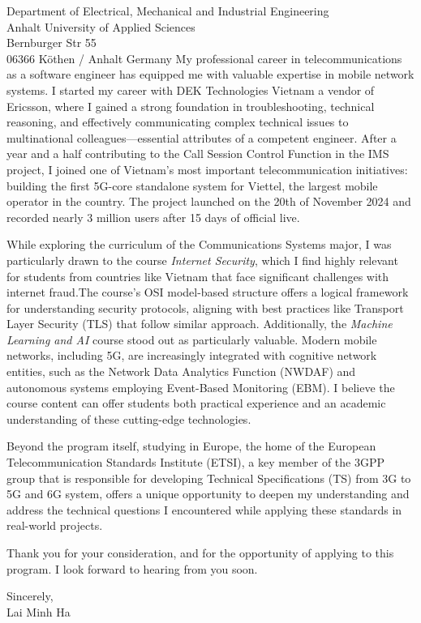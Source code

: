\documentclass[a4paper,12pt]{letter}
\begin{document}
\begin{letter}{
    Department of Electrical, Mechanical and Industrial Engineering
    \\ Anhalt University of Applied Sciences
    \\ Bernburger Str 55 
    \\ 06366 Köthen / Anhalt Germany
}
My professional career in telecommunications as a software engineer has equipped me with valuable expertise in mobile network systems. I started my career with DEK Technologies Vietnam a vendor of Ericsson, where I gained a strong foundation in troubleshooting, technical reasoning, and effectively communicating complex technical issues to multinational colleagues—essential attributes of a competent engineer. After a year and a half contributing to the Call Session Control Function in the IMS project, I joined one of Vietnam's most important telecommunication initiatives: building the first 5G-core standalone system for Viettel, the largest mobile operator in the country. The project launched on the 20th of November 2024 and recorded nearly 3 million users after 15 days of official live.

\vspace{1cm}
While exploring the curriculum of the Communications Systems major, I was particularly drawn to the course \textit{Internet Security}, which I find highly relevant for students from countries like Vietnam that face significant challenges with internet fraud.The course’s OSI model-based structure offers a logical framework for understanding security protocols, aligning with best practices like Transport Layer Security (TLS) that follow similar approach. Additionally, the \textit{Machine Learning and AI} course stood out as particularly valuable. Modern mobile networks, including 5G, are increasingly integrated with cognitive network entities, such as the Network Data Analytics Function (NWDAF) and autonomous systems employing Event-Based Monitoring (EBM). I believe the course content can offer students both practical experience and an academic understanding of these cutting-edge technologies.

Beyond the program itself, studying in Europe, the home of the European Telecommunication Standards Institute (ETSI), a key member of the 3GPP group that is responsible for developing Technical Specifications (TS) from 3G to 5G and 6G system, offers a unique opportunity to deepen my understanding and address the technical questions I encountered while applying these standards in real-world projects.

\vspace{1cm}
Thank you for your consideration, and for the opportunity of applying to this program. I look forward to hearing from you soon.

\begin{flushright}
    Sincerely,
    \\ Lai Minh Ha
\end{flushright}

\end{letter}
\end{document}
